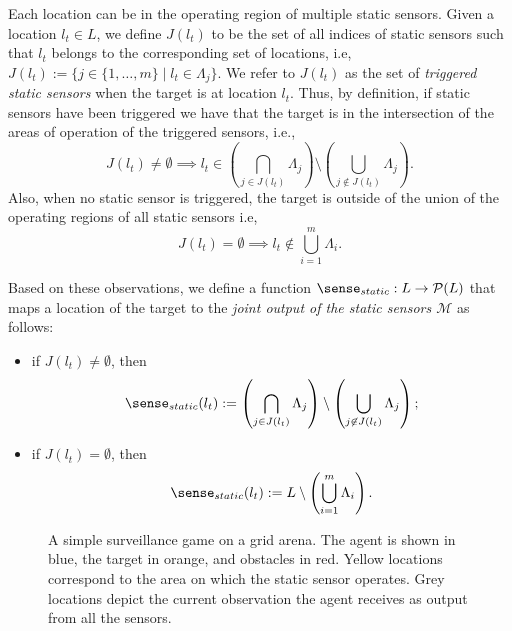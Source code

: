 Each location can be in the operating region of multiple static sensors. Given a location $l_t \in L$, we define $J(l_t)$ to be the set of all indices of static sensors such that $l_t$ belongs to the corresponding set of locations, i.e, 
$J(l_t) := \{j \in \{1,\ldots,m\}\mid l_t\in \Lambda_j\}.$
We refer to $J(l_t)$ as the set of \emph{triggered static sensors}  when the target is at location $l_t$. 
Thus, by definition, if static sensors have been triggered we have that the target is in the intersection of the areas of operation of the triggered sensors, i.e., $$ J(l_t) \neq \emptyset \implies l_t \in \left(\bigcap_{j\in J(l_t)}\Lambda_j\right) \setminus \left(\bigcup_{j\not\in J(l_t)}\Lambda_j\right).$$ Also, when no static sensor is triggered, the target is outside of the union of the operating regions of all static sensors i.e, $$J(l_t) = \emptyset \implies l_t \notin \bigcup_{i=1}^m \Lambda_i.$$

Based on these observations, we define a function $\sense_{static}: L \to \mathcal{P}(L)$ that maps a location of the target to the \emph{joint output of the static sensors $\mathcal M$} as follows:
\begin{itemize}
    \item if $J(l_t) \neq \emptyset$, then 
\[\sense_{static}(l_t) := \left(\bigcap_{j\in J(l_t)}\Lambda_j\right) \setminus \left(\bigcup_{j\not\in J(l_t)}\Lambda_j\right);\]
    
    \item if $J(l_t) = \emptyset$, then
\[\sense_{static}(l_t) := L \setminus \left(\bigcup_{i=1}^m \Lambda_i\right).\]
\end{itemize}


\begin{figure}
\centering
{} \hspace{0.45 in}
\caption{A simple surveillance game on a grid arena. The agent is shown in blue, the target in orange, and obstacles in red. Yellow locations correspond to the area on which the static sensor operates. Grey locations depict the current observation the agent receives as output from all the sensors.}
\label{fig:simple-sensing-static-sensors}
\end{figure}

